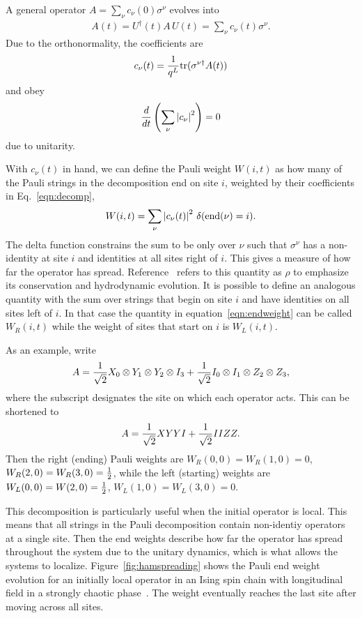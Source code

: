 A general operator $A = \sum_\nu c_{\nu}(0)\sigma^\nu$ evolves into
\begin{align}
A(t) = U^\dag(t)A\,U(t) = \sum_\nu c_\nu(t)\sigma^\nu.\label{eqn:decomp}
\end{align}
Due to the orthonormality, the coefficients are 
\begin{align}
c_\nu(t) = \frac{1}{q^L}\text{tr}(\sigma^{\nu\dag}A(t))
\end{align}
and obey 
\begin{align}
\frac{d}{dt} \left(\sum_\nu \left|c_\nu\right|^2\right) = 0 \nonumber
\end{align}
due to unitarity.

With $c_\nu(t)$ in hand, we can define the Pauli weight $W(i,t)$ as how many of the Pauli strings in the decomposition end on site $i$, weighted by their coefficients in Eq.~\ref{eqn:decomp},
\begin{align}
W(i,t) = \sum_\nu\left|c_\nu(t)\right|^2\,\delta(\text{end}(\nu)=i).
	\label{eqn:endweight}
\end{align}
The delta function constrains the sum to be only over $\nu$ such that $\sigma^\nu$ has a non-identity at site $i$ and identities at all sites right of $i$. This gives a measure of how far the operator has spread. Reference~\cite{Keyserlingk} refers to this quantity as $\rho$ to emphasize its conservation and hydrodynamic evolution. It is possible to define an analogous quantity with the sum over strings that begin on site $i$ and have identities on all sites left of $i$. In that case the quantity in equation~\ref{eqn:endweight} can be called $W_R(i,t)$ while the weight of sites that start on $i$ is $W_L(i,t)$.

As an example, write
\begin{align}
A = \frac{1}{\sqrt{2}} X_0\otimes Y_1\otimes Y_2\otimes I_3 + \frac{1}{\sqrt{2}} I_0\otimes I_1\otimes Z_2\otimes Z_3,
	\nonumber
\end{align}
where the subscript designates the site on which each operator acts. This can be shortened to
\begin{align}
A = \frac{1}{\sqrt{2}} XYYI + \frac{1}{\sqrt{2}} IIZZ\label{eqn:inioper}.
\end{align}
Then the right (ending) Pauli weights are $W_R(0,0) = W_R(1,0) = 0$, $W_R(2,0)= W_R(3,0) =\frac{1}{2}$, while the left (starting) weights are $W_L(0, 0) = W(2,0) =\frac{1}{2}$, $W_L(1,0) = W_L(3,0)=0$.

This decomposition is particularly useful when the initial operator is local. This means that all strings in the Pauli decomposition contain non-identiy operators at a single site. Then the end weights describe how far the operator has spread throughout the system due to the unitary dynamics, which is what allows the systems to localize. Figure~\ref{fig:hamspreading} shows the Pauli end weight evolution for an initially local operator in an Ising spin chain with longitudinal field in a strongly chaotic phase~\cite{Jonay17}. The weight eventually reaches the last site after moving across all sites.

